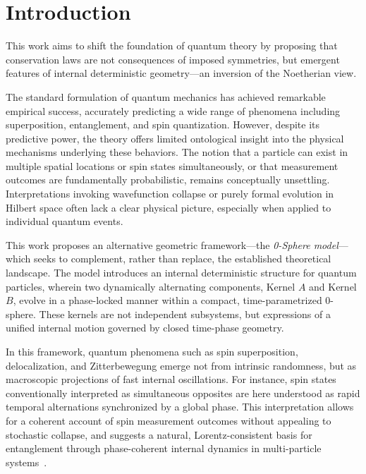 \documentclass[%
 reprint,
 amsmath,amssymb,
 aps,
]{revtex4-1}
\numberwithin{equation}{section}%
\begin{document}
\maketitle

\section{Introduction}

This work aims to shift the foundation of quantum theory by proposing that conservation laws are not consequences of imposed symmetries, but emergent features of internal deterministic geometry—an inversion of the Noetherian view.

The standard formulation of quantum mechanics has achieved remarkable empirical success, accurately predicting a wide range of phenomena including superposition, entanglement, and spin quantization. However, despite its predictive power, the theory offers limited ontological insight into the physical mechanisms underlying these behaviors. The notion that a particle can exist in multiple spatial locations or spin states simultaneously, or that measurement outcomes are fundamentally probabilistic, remains conceptually unsettling. Interpretations invoking wavefunction collapse or purely formal evolution in Hilbert space often lack a clear physical picture, especially when applied to individual quantum events.

This work proposes an alternative geometric framework—the \emph{0-Sphere model}—which seeks to complement, rather than replace, the established theoretical landscape. The model introduces an internal deterministic structure for quantum particles, wherein two dynamically alternating components, Kernel $A$ and Kernel $B$, evolve in a phase-locked manner within a compact, time-parametrized 0-sphere. These kernels are not independent subsystems, but expressions of a unified internal motion governed by closed time-phase geometry.

In this framework, quantum phenomena such as spin superposition, delocalization, and Zitterbewegung emerge not from intrinsic randomness, but as macroscopic projections of fast internal oscillations. For instance, spin states conventionally interpreted as simultaneous opposites are here understood as rapid temporal alternations synchronized by a global phase. This interpretation allows for a coherent account of spin measurement outcomes without appealing to stochastic collapse, and suggests a natural, Lorentz-consistent basis for entanglement through phase-coherent internal dynamics in multi-particle systems~\cite{einstein1905}.
\end{document}
